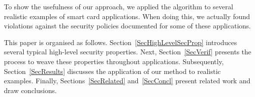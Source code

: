 
To show the usefulness of our approach, we applied the algorithm to
several realistic examples of smart card applications. When doing
this, we actually found violations against the security policies
documented for some of these applications.

This paper is organised as follows. Section~\ref{SecHighLevelSecProp}
introduces several typical high-level security properties. Next,
Section~\ref{SecVerif} presents the process to weave these properties
throughout applications. Subsequently, Section~\ref{SecResults}
discusses the application of our method to realistic
examples. Finally, Sections~\ref{SecRelated} and~\ref{SecConcl}
present related work and draw conclusions.






